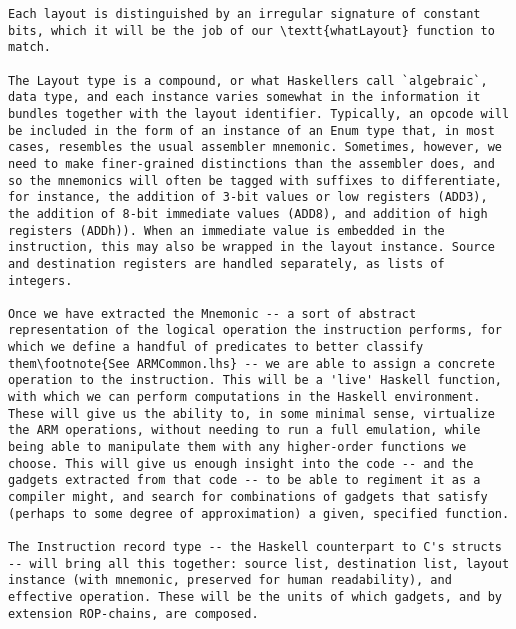 \documentclass{article}
\begin{document}
\begin{Verbatim}[fontsize=\scriptsize]
Each layout is distinguished by an irregular signature of constant bits, which it will be the job of our \textt{whatLayout} function to match.

The Layout type is a compound, or what Haskellers call `algebraic`, data type, and each instance varies somewhat in the information it bundles together with the layout identifier. Typically, an opcode will be included in the form of an instance of an Enum type that, in most cases, resembles the usual assembler mnemonic. Sometimes, however, we need to make finer-grained distinctions than the assembler does, and so the mnemonics will often be tagged with suffixes to differentiate, for instance, the addition of 3-bit values or low registers (ADD3), the addition of 8-bit immediate values (ADD8), and addition of high registers (ADDh)). When an immediate value is embedded in the instruction, this may also be wrapped in the layout instance. Source and destination registers are handled separately, as lists of integers.

Once we have extracted the Mnemonic -- a sort of abstract representation of the logical operation the instruction performs, for which we define a handful of predicates to better classify them\footnote{See ARMCommon.lhs} -- we are able to assign a concrete operation to the instruction. This will be a 'live' Haskell function, with which we can perform computations in the Haskell environment. These will give us the ability to, in some minimal sense, virtualize the ARM operations, without needing to run a full emulation, while being able to manipulate them with any higher-order functions we choose. This will give us enough insight into the code -- and the gadgets extracted from that code -- to be able to regiment it as a compiler might, and search for combinations of gadgets that satisfy (perhaps to some degree of approximation) a given, specified function.

The Instruction record type -- the Haskell counterpart to C's structs -- will bring all this together: source list, destination list, layout instance (with mnemonic, preserved for human readability), and effective operation. These will be the units of which gadgets, and by extension ROP-chains, are composed.


\end{Verbatim}
\end{document}
